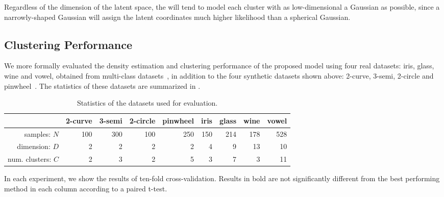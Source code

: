 Regardless of the dimension of the latent space, the \iwmm{} will tend to model each cluster with as low-dimensional a Gaussian as possible, 
since a narrowly-shaped Gaussian will assign the latent coordinates much higher likelihood than a spherical Gaussian.

\subsection{Clustering Performance}
We more formally evaluated the density estimation and clustering performance of the proposed model using four real datasets: iris, glass, wine and vowel, obtained from \LIBSVM{} multi-class datasets~\citep{chang2011libsvm}, in addition to the four synthetic datasets shown above: 2-curve, 3-semi, 2-circle and pinwheel~\citep{adams2009archipelago}.
The statistics of these datasets are summarized in .
%
\begin{table}[ht!]
\centering
\caption[Datasets used for evaluation of the \siwmm{}]
{Statistics of the datasets used for evaluation.}
\label{tab:statistics}
\begin{tabular}{rrrrrrrrr}
\hline
 & 2-curve & 3-semi & 2-circle & pinwheel & iris & glass  & wine  & vowel  \\
\hline
samples: $N$ & 100 & 300 & 100 & 250 & 150 & 214 & 178 & 528 \\
dimension: $D$ & 2 & 2 & 2 & 2 & 4 & 9 & 13 & 10 \\
num. clusters: $C$ & 2 & 3 & 2 & 5 & 3 & 7 & 3 & 11 \\
\hline
\end{tabular}
\end{table}
%
In each experiment, we show the results of ten-fold cross-validation.
Results in bold are not significantly different from the best performing method in each column according to a paired t-test.
%
%

